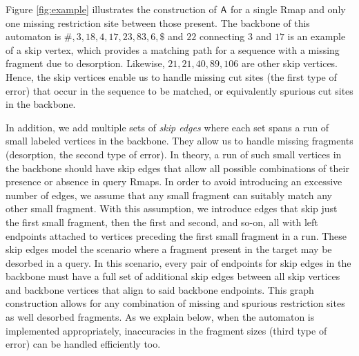   Figure \ref{fig:example} illustrates the construction of $\mathsf{A}$ for a single Rmap and only one missing restriction site between those present.  The backbone of this automaton is $\#, 3, 18, 4, 17, 23, 83, 6, \$$ and $22$ connecting $3$ and $17$ is an example of a skip vertex, which provides a matching path for a sequence with a missing fragment due to desorption.  Likewise, $21, 21, 40, 89, 106$ are other skip vertices. Hence, the skip vertices enable us to handle missing cut sites (the first type of error) that occur in the sequence to be matched, or equivalently spurious cut sites in the backbone.  

In addition, we add multiple sets of {\em skip edges} where each set spans a run of small labeled vertices in the backbone.%
They allow us to handle missing fragments (desorption, the second type of error).  
In theory, a run of such small vertices in the backbone should have skip edges that allow all possible combinations of their presence or absence in query Rmaps.  In order to avoid introducing an excessive number of edges, we assume that any small fragment can suitably match any other small fragment. With this assumption, we introduce edges that skip just the first small fragment, then the first and second, and so-on, all with left endpoints attached to vertices preceding the first small fragment in a run.  These skip edges model the scenario where a fragment present in the target may be desorbed in a query.  In this scenario, every pair of endpoints for skip edges in the backbone must have a full set of additional skip edges between all skip vertices and backbone vertices that align to said backbone endpoints. 
This graph construction allows for any combination of missing and spurious restriction sites as well desorbed fragments.  As we explain below, when the automaton is implemented appropriately, inaccuracies in the fragment sizes (third type of error) can be handled efficiently too. %



